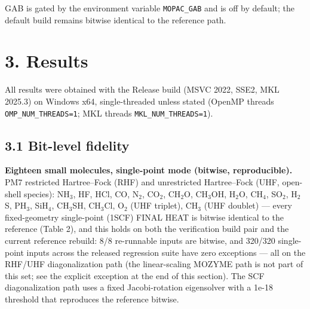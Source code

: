 \documentclass[preprint,12pt]{elsarticle}
\begin{document}
GAB is gated by the environment variable \texttt{MOPAC\_GAB} and is off by default; the default build remains bitwise identical to the reference path.



\section{3. Results}

All results were obtained with the Release build (MSVC 2022, SSE2, MKL 2025.3) on Windows x64, single-threaded unless stated (OpenMP threads \texttt{OMP\_NUM\_THREADS=1}; MKL threads \texttt{MKL\_NUM\_THREADS=1}).


\subsection{3.1 Bit-level fidelity}
\textbf{Eighteen small molecules, single-point mode (bitwise, reproducible).} PM7 restricted Hartree--Fock (RHF) and unrestricted Hartree--Fock (UHF, open-shell species): NH$_{3}$, HF, HCl, CO, N$_{2}$, CO$_{2}$, CH$_{2}$O, CH$_{3}$OH, H$_{2}$O, CH$_{4}$, SO$_{2}$, H$_{2}$S, PH$_{3}$, SiH$_{4}$, CH$_{3}$SH, CH$_{3}$Cl, O$_{2}$ (UHF triplet), CH$_{3}$ (UHF doublet) --- every fixed-geometry single-point (1SCF) FINAL HEAT is bitwise identical to the reference (Table 2), and this holds on both the verification build pair and the current reference rebuild: 8/8 re-runnable inputs are bitwise, and 320/320 single-point inputs across the released regression suite have zero exceptions --- all on the RHF/UHF diagonalization path (the linear-scaling MOZYME path is not part of this set; see the explicit exception at the end of this section). The SCF diagonalization path uses a fixed Jacobi-rotation eigensolver with a 1e-18 threshold that reproduces the reference bitwise.
\end{document}
